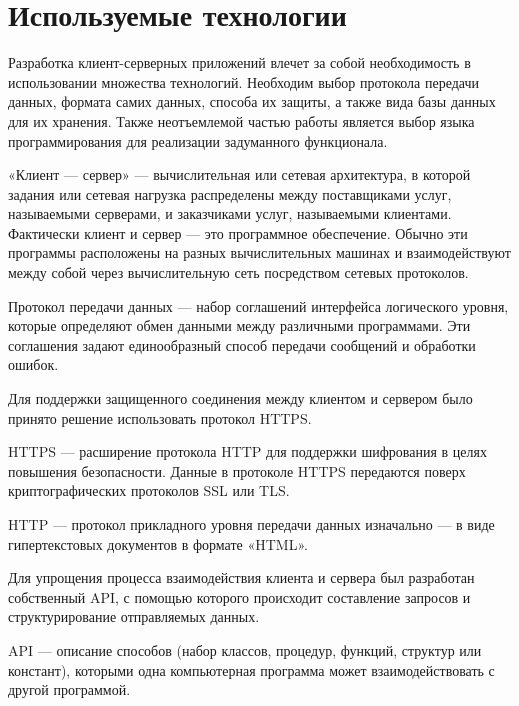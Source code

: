 \clearpage
\section{Используемые технологии}
Разработка клиент-серверных приложений влечет за собой необходимость в использовании множества технологий.
Необходим выбор протокола передачи данных, формата самих данных, способа их защиты, а также вида базы данных для их хранения.
Также неотъемлемой частью работы является выбор языка программирования для реализации задуманного функционала.

\begin{definition}
    «Клиент --- сервер» --- вычислительная или сетевая архитектура, в которой задания или сетевая нагрузка распределены между поставщиками услуг,
    называемыми серверами, и заказчиками услуг, называемыми клиентами. Фактически клиент и сервер --- это программное обеспечение.
    Обычно эти программы расположены на разных вычислительных машинах и взаимодействуют между собой через вычислительную сеть посредством сетевых протоколов.
\end{definition}

\begin{definition}
    Протокол передачи данных --- набор соглашений интерфейса логического уровня, которые определяют обмен данными между различными программами.
    Эти соглашения задают единообразный способ передачи сообщений и обработки ошибок.
\end{definition}

Для поддержки защищенного соединения между клиентом и сервером было принято решение использовать протокол HTTPS.
\begin{definition}
    HTTPS --- расширение протокола HTTP для поддержки шифрования в целях повышения безопасности.
    Данные в протоколе HTTPS передаются поверх криптографических протоколов SSL или TLS.
\end{definition}

\begin{definition}
    HTTP --- протокол прикладного уровня передачи данных изначально --- в виде гипертекстовых документов в формате «HTML».
\end{definition}

Для упрощения процесса взаимодействия клиента и сервера был разработан собственный API,
с помощью которого происходит составление запросов и структурирование отправляемых данных.
\begin{definition}
    API --- описание способов (набор классов, процедур, функций, структур или констант),
    которыми одна компьютерная программа может взаимодействовать с другой программой.
\end{definition}

